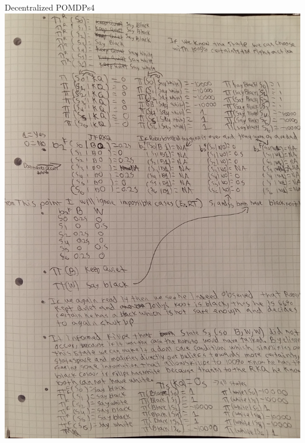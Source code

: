 \begin{questions}
\begin{question}{Decentralized POMDPs}{4}
	\includegraphics[scale=0.2]{p5.jpg}	
		\newpage


\end{question}
\end{questions}
